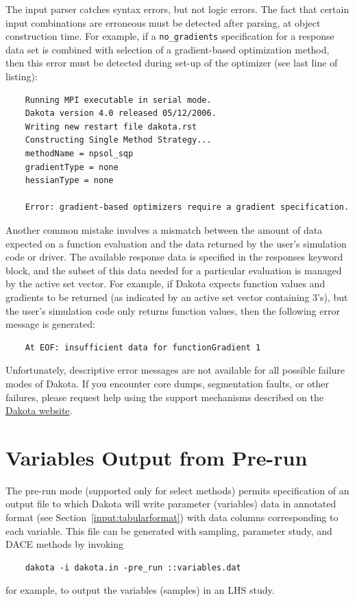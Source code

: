 The input parser catches syntax errors, but not logic errors. The fact
that certain input combinations are erroneous must be detected after
parsing, at object construction time. For example, if a
\texttt{no\_gradients} specification for a response data set is
combined with selection of a gradient-based optimization method, then
this error must be detected during set-up of the optimizer (see last
line of listing):
\begin{small}
\begin{verbatim}
    Running MPI executable in serial mode.
    Dakota version 4.0 released 05/12/2006.
    Writing new restart file dakota.rst
    Constructing Single Method Strategy...
    methodName = npsol_sqp
    gradientType = none
    hessianType = none

    Error: gradient-based optimizers require a gradient specification.
\end{verbatim}
\end{small}

Another common mistake involves a mismatch between the amount of data
expected on a function evaluation and the data returned by the user's
simulation code or driver. The available response data is specified in
the responses keyword block, and the subset of this data needed for a
particular evaluation is managed by the active set vector. For
example, if Dakota expects function values and gradients to be
returned (as indicated by an active set vector containing 3's), but
the user's simulation code only returns function values, then the
following error message is generated:
\begin{small}
\begin{verbatim}
    At EOF: insufficient data for functionGradient 1
\end{verbatim}
\end{small}

Unfortunately, descriptive error messages are not available for all
possible failure modes of Dakota. If you encounter core dumps,
segmentation faults, or other failures, please request help using the
support mechanisms described on the
\href{http://dakota.sandia.gov/}{Dakota website}.

\section{Variables Output from Pre-run}

The pre-run mode (supported only for select methods) permits
specification of an output file to which Dakota will write parameter
(variables) data in annotated format (see
Section~\ref{input:tabularformat}) with data columns corresponding to
each variable.  This file can be generated with sampling, parameter
study, and DACE methods by invoking
\begin{small}
\begin{verbatim}
    dakota -i dakota.in -pre_run ::variables.dat
\end{verbatim}
\end{small}
for example, to output the variables (samples) in an LHS study.

